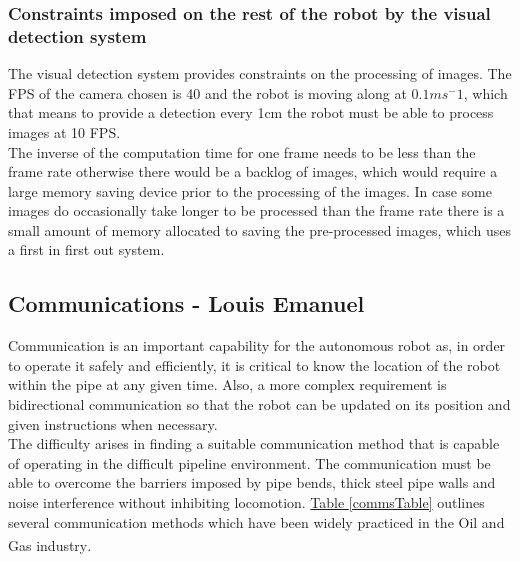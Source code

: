 \documentclass[11pt]{article}		%
\newcommand{\supercite}[1]{\textsuperscript{\cite{#1}}}		%
\newcommand{\tableref}[1]{\hyperref[#1]{Table \ref*{#1}}}     %
\begin{document}
	        \subsubsection{Constraints imposed on the rest of the robot by the visual detection system}
	        The visual detection system provides constraints on the processing of images. The FPS of the camera chosen is 40 and the robot is moving along at $0.1ms^-1$, which that means to  provide a detection every 1cm the robot must be able to process images at 10 FPS.
	        \\
	        The inverse of the computation time for one frame needs to be less than the frame rate otherwise there would be a backlog of images, which would require a large memory saving device prior to the processing of the images. 
	        In case some images do occasionally take longer to be processed than the frame rate there is a small amount of memory allocated to saving the pre-processed images, which uses a first in first out system.
		
		\subsection[Communications]{Communications - Louis Emanuel}

			Communication is an important capability for the autonomous robot as, in order to operate it safely and efficiently, it is critical to know the location of the robot within the pipe at any given time. 
			Also, a more complex requirement is bidirectional communication so that the robot can be updated on its position and given instructions when necessary. 
			\\
		    The difficulty arises in finding a suitable communication method that is capable of operating in the difficult pipeline environment. 
		    The communication must be able to overcome the barriers imposed by pipe bends, thick steel pipe walls and noise interference without inhibiting locomotion.
		    \tableref{commsTable} outlines several communication methods which have been widely practiced in the Oil and Gas industry\supercite{acoustic2020}.
		    \\
		    
\end{document}
